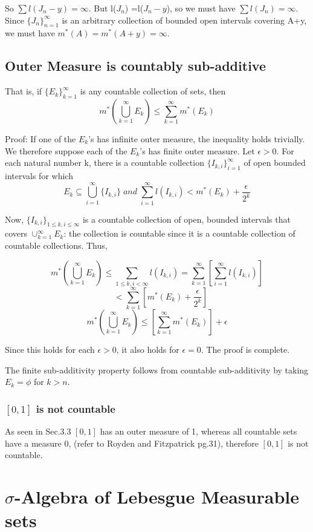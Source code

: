 \documentclass{article}
\begin{document}
So $\sum l(J_n - y) =\infty$. But l($J_n$) =l($J_n - y$), so we must have $\sum l(J_n) =\infty$. Since $\{J_n\}_{n=1}^{\infty} $ is an arbitrary collection of bounded open intervals covering A+y, we must have $m^*(A)=m^*(A+y)= \infty$. 

\subsection{Outer Measure is countably sub-additive}

That is, if $\{E_k\}_{k=1}^{\infty} $ is any countable collection of sets, then
$$ m^*(\bigcup_{k=1}^{\infty} E_k) \leq \sum_{k=1}^{\infty} m^{*}(E_k)$$

Proof: If one of the $E_k$'s has infinite outer measure, the inequality holds trivially. We therefore suppose each of the $E_k$'s has finite outer measure. Let $\epsilon > 0$. For each natural number k, there is a countable collection $\{ I_{k,i} \}_{i=1}^{\infty}$ of open bounded intervals for which
$$ E_k \subseteq \bigcup_{i=1}^{\infty} \{ I_{k,i} \} \; and \; \sum_{i=1}^{\infty} l(I_{k,i}) < m^{*}(E_k) +\frac{\epsilon}{2^k}  $$

Now, $\{I_{k,i}\}_{1 \leq k , i \leq \infty}$ is a countable collection of open, bounded intervals that covers $\cup_{k=1}^{\infty} E_k$: the collection is countable since it is a countable collection of countable collections. Thus,

$$ m^{*}(\bigcup_{k=1}^{\infty} E_k) \leq \sum_{1\leq k,i<\infty } l(I_{k,i})= \sum_{k=1}^{\infty}[\sum_{i=1}^{\infty} l(I_{k,i})]$$
$$\;\;\;<\sum_{k=1}^{\infty}[m^{*}(E_k) + \frac{\epsilon}{2^k}]$$
$$  m^{*}(\bigcup_{k=1}^{\infty} E_k) \leq [\sum_{k=1}^{\infty}m^{*}(E_k)]+\epsilon$$

Since this holds for each $\epsilon>0$, it also holds for $\epsilon=0$. The proof is complete.

The finite sub-additivity property follows from countable sub-additivity by taking $E_k = \phi$ for $k>n$.

\subsubsection{$[0,1]$ is not countable}

As seen in Sec.3.3 $[0,1]$ has an outer measure of 1, whereas all countable sets have a measure 0, (refer to Royden and Fitzpatrick pg.31), therefore $[0,1]$ is not countable.

\section{$\sigma$-Algebra of Lebesgue Measurable sets}
\end{document}
